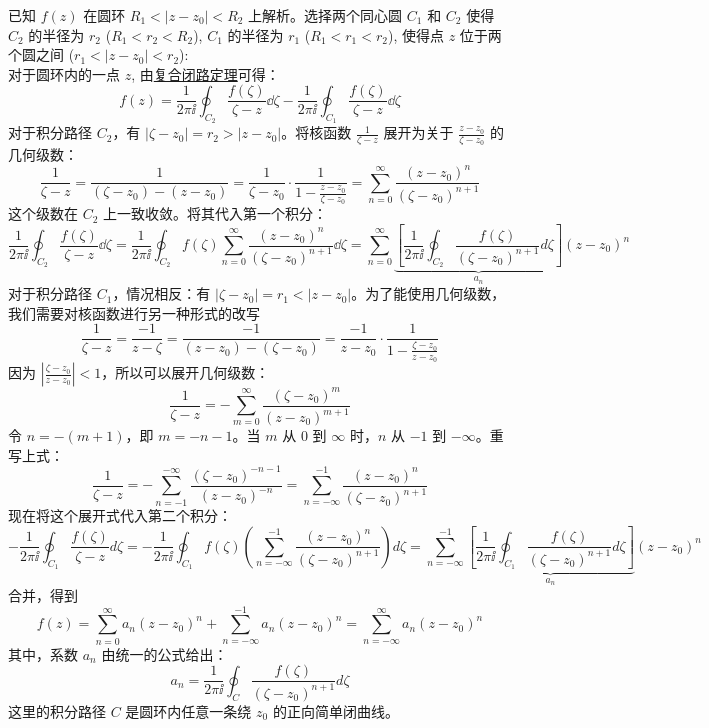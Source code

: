 \documentclass[UTF8]{ctexart}
\begin{document}
\begin{prf}
    已知 $f(z)$ 在圆环 $R_1 < |z - z_0| < R_2$ 上解析。选择两个同心圆 $C_1$ 和 $C_2$ 使得 $C_2$ 的半径为 $r_2$ ($R_1 < r_2 < R_2$), $C_1$ 的半径为 $r_1$ ($R_1 < r_1 < r_2$), 使得点 $z$ 位于两个圆之间 ($r_1 < |z - z_0| < r_2$):\\
    对于圆环内的一点 $z$, 由\hyperref[thm:CombinedClosedCircuit]{复合闭路定理}可得：
    $$f(z) = \frac{1}{2\pi\ii} \oint_{C_2} \frac{f(\zeta)}{\zeta - z} \dd\zeta - \frac{1}{2\pi\ii} \oint_{C_1} \frac{f(\zeta)}{\zeta - z}  \dd\zeta$$
    对于积分路径 $C_2$，有 $|\zeta - z_0| = r_2 > |z - z_0|$。将核函数 $\frac{1}{\zeta - z}$ 展开为关于 $\frac{z-z_0}{\zeta-z_0}$ 的几何级数：
    $$\frac{1}{\zeta - z} = \frac{1}{(\zeta - z_0) - (z - z_0)} = \frac{1}{\zeta - z_0} \cdot \frac{1}{1 - \frac{z-z_0}{\zeta-z_0}} = \sum_{n=0}^{\infty} \frac{(z - z_0)^n}{(\zeta - z_0)^{n+1}}$$
    这个级数在 $C_2$ 上一致收敛。将其代入第一个积分：
    $$\frac{1}{2\pi\ii} \oint_{C_2} \frac{f(\zeta)}{\zeta - z} \dd\zeta = \frac{1}{2\pi\ii} \oint_{C_2} f(\zeta) \sum_{n=0}^{\infty} \frac{(z - z_0)^n}{(\zeta - z_0)^{n+1}} \dd\zeta = \sum_{n=0}^{\infty} \underbrace{\left[ \frac{1}{2\pi\ii} \oint_{C_2} \frac{f(\zeta)}{(\zeta - z_0)^{n+1}} d\zeta \right]}_{a_n} (z - z_0)^n$$
    对于积分路径 $C_1$，情况相反：有 $|\zeta - z_0| = r_1 < |z - z_0|$。为了能使用几何级数，我们需要对核函数进行另一种形式的改写
    $$\frac{1}{\zeta - z} = \frac{-1}{z - \zeta} = \frac{-1}{(z - z_0) - (\zeta - z_0)} = \frac{-1}{z - z_0} \cdot \frac{1}{1 - \frac{\zeta-z_0}{z-z_0}}$$
    因为 $\left| \frac{\zeta-z_0}{z-z_0} \right| < 1$，所以可以展开几何级数：
    $$\frac{1}{\zeta - z} = -\sum_{m=0}^{\infty} \frac{(\zeta - z_0)^m}{(z - z_0)^{m+1}}$$
    令 $n = -(m+1)$，即 $m = -n - 1$。当 $m$ 从 $0$ 到 $\infty$ 时，$n$ 从 $-1$ 到 $-\infty$。重写上式：
    $$\frac{1}{\zeta - z} = -\sum_{n=-1}^{-\infty} \frac{(\zeta - z_0)^{-n-1}}{(z - z_0)^{-n}} = \sum_{n=-\infty}^{-1} \frac{(z - z_0)^n}{(\zeta - z_0)^{n+1}}$$
    现在将这个展开式代入第二个积分：
    $$-\frac{1}{2\pi\ii} \oint_{C_1} \frac{f(\zeta)}{\zeta - z}  d\zeta = -\frac{1}{2\pi\ii} \oint_{C_1} f(\zeta) \left( \sum_{n=-\infty}^{-1} \frac{(z - z_0)^n}{(\zeta - z_0)^{n+1}} \right) d\zeta = \sum_{n=-\infty}^{-1} \underbrace{\left[ \frac{1}{2\pi\ii} \oint_{C_1} \frac{f(\zeta)}{(\zeta - z_0)^{n+1}} d\zeta \right]}_{a_n} (z - z_0)^n$$
    合并，得到
    $$f(z) = \sum_{n=0}^{\infty} a_n (z - z_0)^n + \sum_{n=-\infty}^{-1} a_n (z - z_0)^n = \sum_{n=-\infty}^{\infty} a_n (z - z_0)^n$$
    其中，系数 $a_n$ 由统一的公式给出：
    $$a_n = \frac{1}{2\pi\ii} \oint_C \frac{f(\zeta)}{(\zeta - z_0)^{n+1}}  d\zeta$$
    这里的积分路径 $C$ 是圆环内任意一条绕 $z_0$ 的正向简单闭曲线。
\end{prf}
\end{document}
